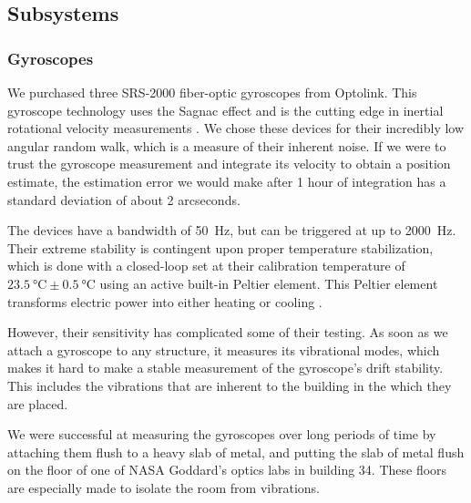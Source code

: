 \begin{figure}[!ht]
	\centering
	
	\caption[The celestial sphere]{}
	\label{fig:celestialSphere}
    \end{figure}

\begin{figure}[!ht]
	\centering
	
	\caption[The star camera reference frame]{}
	\label{fig:starcamRefFrame}
    \end{figure}


\subsection{Subsystems}



\subsubsection{Gyroscopes}

We purchased three SRS-2000 fiber-optic gyroscopes from Optolink. This gyroscope technology uses the Sagnac effect and is the cutting edge in inertial rotational velocity measurements \citep[for a review of the state-of-the-art see, \textit{e.g.}][]{ElBadaoui:2014fr}. We chose these devices for their incredibly low angular random walk, which is a measure of their inherent noise. If we were to trust the gyroscope measurement and integrate its velocity to obtain a position estimate, the estimation error we would make after 1 hour of integration has a standard deviation of about 2 arcseconds.

The devices have a bandwidth of \SI{50}{\hertz}, but can be triggered at up to \SI{2000}{\hertz}. Their extreme stability is contingent upon proper temperature stabilization, which is done with a closed-loop set at their calibration temperature of $\SI{23.5}{\celsius}\pm\SI{0.5}{\celsius}$ using an active built-in Peltier element. This Peltier element transforms electric power into either heating or cooling \citep{Peltier:1834vu}.

However, their sensitivity has complicated some of their testing. As soon as we attach a gyroscope to any structure, it measures its vibrational modes, which makes it hard to make a stable measurement of the gyroscope's drift stability. This includes the vibrations that are inherent to the building in the which they are placed.

We were successful at measuring the gyroscopes over long periods of time by attaching them flush to a heavy slab of metal, and putting the slab of metal flush on the floor of one of NASA Goddard's optics labs in building 34. These floors are especially made to isolate the room from vibrations.

